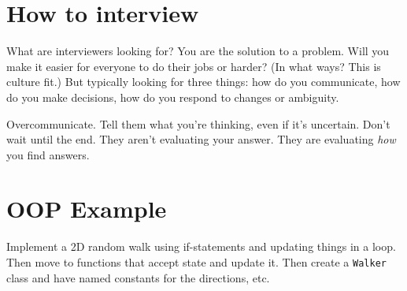 \section{How to interview} What are interviewers looking for? You are the solution to a problem. Will you make it easier for everyone to do their jobs or harder? (In what ways? This is culture fit.) But typically looking for three things: how do you communicate, how do you make decisions, how do you respond to changes or ambiguity.

Overcommunicate. Tell them what you're thinking, even if it's uncertain. Don't wait until the end. They aren't evaluating your answer. They are evaluating \emph{how} you find answers.

\section{OOP Example} Implement a 2D random walk using if-statements and updating things in a loop. Then move to functions that accept state and update it. Then create a \texttt{Walker} class and have named constants for the directions, etc.
